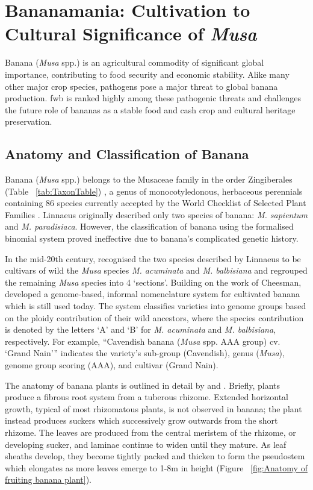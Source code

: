 \section{Bananamania: Cultivation to Cultural Significance of \textit{Musa}}

Banana (\textit{Musa} spp.) is an agricultural commodity of significant global importance, contributing to food security and economic stability. Alike many other major crop species, pathogens pose a major threat to global banana production. \ac{fwb} is ranked highly among these pathogenic threats and challenges the future role of bananas as a stable food and cash crop and cultural heritage preservation. 

\subsection{Anatomy and Classification of Banana}  

Banana (\textit{Musa} spp.) belongs to the Musaceae family in the order Zingiberales (Table ~\ref{tab:TaxonTable}) \parencite{Schoch2020}, a genus of monocotyledonous, herbaceous perennials containing 86 species currently accepted by the World Checklist of Selected Plant Families \parencite{WCSPF2023}. Linnaeus originally described only two species of banana: \textit{M. sapientum }and \textit{M. paradisiaca}. However, the classification of banana using the formalised binomial system proved ineffective due to banana’s complicated genetic history.

In the mid-20th century, \textcite{Cheesman1947} recognised the two species described by Linnaeus to be cultivars of wild the \textit{Musa} species \textit{M. acuminata }and \textit{M. balbisiana} and regrouped the remaining \textit{Musa} species into 4 ‘sections’. Building on the work of Cheesman, \textcite{Simmonds1955} developed a genome-based, informal nomenclature system for cultivated banana which is still used today. The system classifies varieties into genome groups based on the ploidy contribution of their wild ancestors, where the species contribution is denoted by the letters ‘A’ and ‘B’ for \textit{M. acuminata} and \textit{M. balbisiana}, respectively. For example, “Cavendish banana (\textit{Musa } spp. AAA group) cv. ‘Grand Nain’” indicates the variety’s sub-group (Cavendish), genus (\textit{Musa}), genome group scoring (AAA), and cultivar (Grand Nain).

The anatomy of banana plants is outlined in detail by \textcite{Bakry2009} and \textcite{Robinson2010}. Briefly, plants produce a fibrous root system from a tuberous rhizome. Extended horizontal growth, typical of most rhizomatous plants, is not observed in banana; the plant instead produces suckers which successively grow outwards from the short rhizome. The leaves are produced from the central meristem of the rhizome, or developing sucker, and laminae continue to widen until they mature. As leaf sheaths develop, they become tightly packed and thicken to form the pseudostem which elongates as more leaves emerge to 1-8m in height (Figure ~\ref{fig:Anatomy of fruiting banana plant}). 

